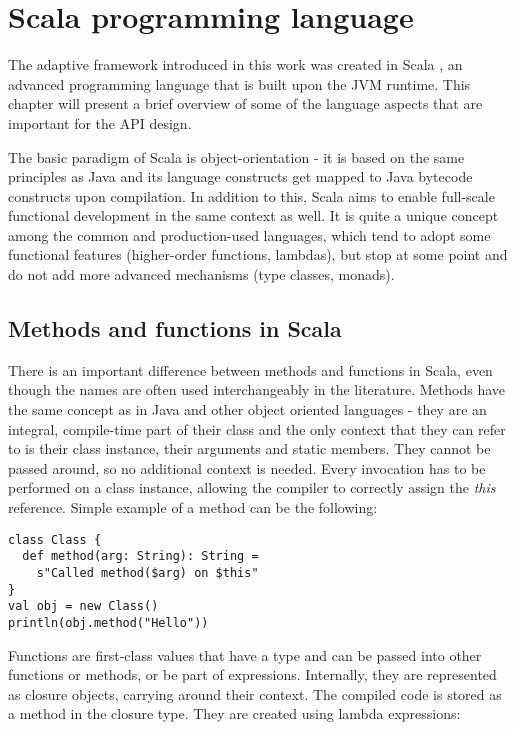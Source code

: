 \chapter{Scala programming language}
\label{chap:scala}

The adaptive framework introduced in this work was created in Scala \cite{noauthor_scala_nodate}, an advanced programming language that is built upon the JVM runtime. This chapter will present a brief overview of some of the language aspects that are important for the API design.

The basic paradigm of Scala is object-orientation - it is based on the same principles as Java and its language constructs get mapped to Java bytecode constructs upon compilation. In addition to this, Scala aims to enable full-scale functional development in the same context as well. It is quite a unique concept among the common and production-used languages, which tend to adopt some functional features (higher-order functions, lambdas), but stop at some point and do not add more advanced mechanisms (type classes, monads).

\section{Methods and functions in Scala}
\label{sec:metandfun}

There is an important difference between methods and functions in Scala, even though the names are often used interchangeably in the literature. Methods have the same concept as in Java and other object oriented languages - they are an integral, compile-time part of their class and the only context that they can refer to is their class instance, their arguments and static members. They cannot be passed around, so no additional context is needed. Every invocation has to be performed on a class instance, allowing the compiler to correctly assign the \textit{this} reference. Simple example of a method can be the following:

\lstset{style=Scala}
\begin{lstlisting}
class Class {
  def method(arg: String): String = 
    s"Called method($arg) on $this"
}
val obj = new Class()
println(obj.method("Hello"))
\end{lstlisting}

Functions are first-class values that have a type and can be passed into other functions or methods, or be part of expressions. Internally, they are represented as closure objects, carrying around their context. The compiled code is stored as a method in the closure type. They are created using lambda expressions:

